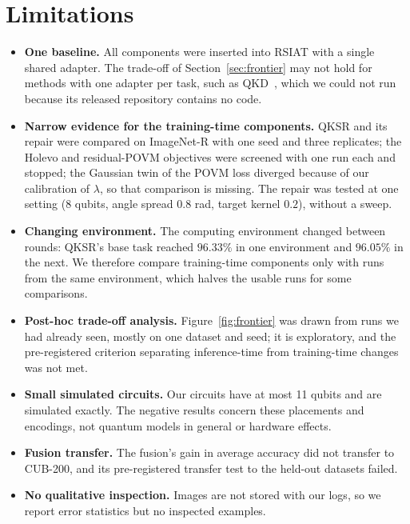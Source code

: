 \section*{Limitations}

\begin{itemize}
  \item \textbf{One baseline.} All components were inserted into RSIAT with a
    single shared adapter. The trade-off of Section~\ref{sec:frontier} may not
    hold for methods with one adapter per task, such as QKD~\citep{li2026qkd},
    which we could not run because its released repository contains no code.
  \item \textbf{Narrow evidence for the training-time components.} QKSR and
    its repair were compared on ImageNet-R with one seed and three
    replicates; the Holevo and residual-POVM objectives were screened with one
    run each and stopped; the Gaussian twin of the POVM loss diverged because
    of our calibration of $\lambda$, so that comparison is missing. The repair
    was tested at one setting (8 qubits, angle spread $0.8$ rad, target kernel
    $0.2$), without a sweep.
  \item \textbf{Changing environment.} The computing environment changed
    between rounds: QKSR's base task reached $96.33\%$ in one environment and
    $96.05\%$ in the next. We therefore compare training-time components only
    with runs from the same environment, which halves the usable runs for
    some comparisons.
  \item \textbf{Post-hoc trade-off analysis.} Figure~\ref{fig:frontier} was
    drawn from runs we had already seen, mostly on one dataset and seed; it is
    exploratory, and the pre-registered criterion separating inference-time
    from training-time changes was not met.
  \item \textbf{Small simulated circuits.} Our circuits have at most 11 qubits
    and are simulated exactly. The negative results concern these placements
    and encodings, not quantum models in general or hardware effects.
  \item \textbf{Fusion transfer.} The fusion's gain in average accuracy did
    not transfer to CUB-200, and its pre-registered transfer test to the
    held-out datasets failed.
  \item \textbf{No qualitative inspection.} Images are not stored with our
    logs, so we report error statistics but no inspected examples.
\end{itemize}

